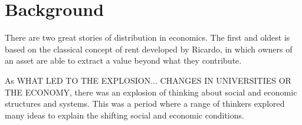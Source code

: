 \chapter{Background} \label{chapter-background}

There are two great %
stories of distribution in economics. The first and oldest is based on the classical concept of rent developed by Ricardo, in which owners of an asset are able to extract a value beyond what they contribute. 

As WHAT LED TO THE EXPLOSION... CHANGES IN UNIVERSITIES OR THE ECONOMY, there was an explosion of thinking about social and economic structures and systems.  This was a period where a range of thinkers explored many ideas to explain the shifting social and economic conditions. 

